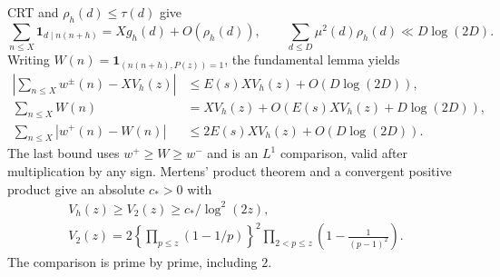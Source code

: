 \documentclass[11pt]{article}
\theoremstyle{definition}
\newcommand{\ind}{\mathbf 1}
\theoremstyle{remark}
\numberwithin{equation}{section}
\begin{document}
CRT and $\rho_h(d)\le\tau(d)$ give
\begin{equation}\label{eq:a-crt}
 \sum_{n\le X}\ind_{d\mid n(n+h)}=Xg_h(d)+O(\rho_h(d)),\qquad
 \sum_{d\le D}\mu^2(d)\rho_h(d)\ll D\log(2D).
\end{equation}
Writing $W(n)=\ind_{(n(n+h),P(z))=1}$, the fundamental lemma yields
\begin{equation}\label{eq:a-sieve-lone}
\begin{aligned}
 \left|\sum_{n\le X}w^\pm(n)-XV_h(z)\right|&\le E(s)XV_h(z)+O(D\log(2D)),\\
 \sum_{n\le X}W(n)&=XV_h(z)+O(E(s)XV_h(z)+D\log(2D)),\\
 \sum_{n\le X}|w^+(n)-W(n)|&\le2E(s)XV_h(z)+O(D\log(2D)).
\end{aligned}
\end{equation}
The last bound uses $w^+\ge W\ge w^-$ and is an $L^1$ comparison, valid after multiplication by any sign.
Mertens' product theorem \cite[Section~2.2]{MV} and a convergent positive product give an absolute $c_*>0$ with
\begin{equation}\label{eq:a-density}
\begin{gathered}
 V_h(z)\ge V_2(z)\ge c_*/\log^2(2z),\\
 V_2(z)=2\left\{\prod_{p\le z}(1-1/p)\right\}^2
 \prod_{2<p\le z}\left(1-\frac1{(p-1)^2}\right).
\end{gathered}
\end{equation}
The comparison is prime by prime, including $2$.
\end{document}
